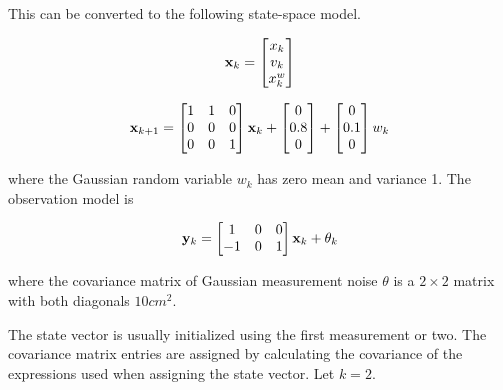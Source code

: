 This can be converted to the following state-space \gls{model}.

\begin{equation}
  \mathbf{x}_k =
  \begin{bmatrix}
    x_k \\
    v_k \\
    x_k^w
  \end{bmatrix}
\end{equation}

\begin{equation}
  \mathbf{x}_{k+1} =
  \begin{bmatrix}
    1 & 1 & 0 \\
    0 & 0 & 0 \\
    0 & 0 & 1
  \end{bmatrix} \mathbf{x}_k +
  \begin{bmatrix}
    0 \\
    0.8 \\
    0
  \end{bmatrix} +
  \begin{bmatrix}
    0 \\
    0.1 \\
    0
  \end{bmatrix} w_k
\end{equation}

where the Gaussian random variable $w_k$ has zero mean and variance 1. The
observation \gls{model} is

\begin{equation}
  \mathbf{y}_k =
  \begin{bmatrix}
    1 & 0 & 0 \\
    -1 & 0 & 1
  \end{bmatrix} \mathbf{x}_k + \theta_k
\end{equation}

where the covariance matrix of Gaussian measurement noise $\theta$ is a
$2 \times 2$ matrix with both diagonals $10 cm^2$.

The state vector is usually initialized using the first measurement or two. The
covariance matrix entries are assigned by calculating the covariance of the
expressions used when assigning the state vector. Let $k = 2$.

